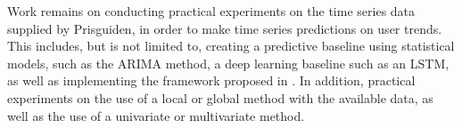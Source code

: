   Work remains on conducting practical experiments on the time series data supplied by Prisguiden,
  in order to make time series predictions on user trends.
  This includes, but is not limited to, creating a predictive baseline using statistical models, such as the ARIMA method, a deep learning baseline such as an LSTM,
  as well as implementing the framework proposed in .
  In addition, practical experiments on the use of a local or global method with the available data,
  as well as the use of a univariate or multivariate method.
\fi
